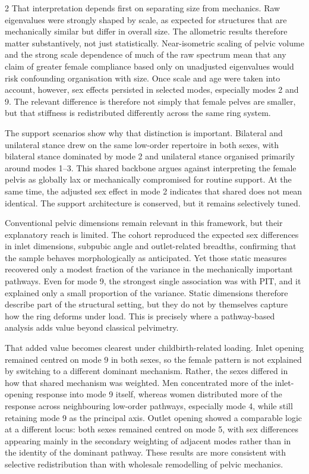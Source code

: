 \documentclass[openacc]{rsproca_new}
\begin{document}
\begin{multicols}{2}
That interpretation depends first on separating size from mechanics. Raw eigenvalues were strongly shaped by scale, as expected for structures that are mechanically similar but differ in overall size. The allometric results therefore matter substantively, not just statistically. Near-isometric scaling of pelvic volume and the strong scale dependence of much of the raw spectrum mean that any claim of greater female compliance based only on unadjusted eigenvalues would risk confounding organisation with size. Once scale and age were taken into account, however, sex effects persisted in selected modes, especially modes 2 and 9. The relevant difference is therefore not simply that female pelves are smaller, but that stiffness is redistributed differently across the same ring system.

The support scenarios show why that distinction is important. Bilateral and unilateral stance drew on the same low-order repertoire in both sexes, with bilateral stance dominated by mode 2 and unilateral stance organised primarily around modes 1--3. This shared backbone argues against interpreting the female pelvis as globally lax or mechanically compromised for routine support. At the same time, the adjusted sex effect in mode 2 indicates that shared does not mean identical. The support architecture is conserved, but it remains selectively tuned.

Conventional pelvic dimensions remain relevant in this framework, but their explanatory reach is limited. The cohort reproduced the expected sex differences in inlet dimensions, subpubic angle and outlet-related breadths, confirming that the sample behaves morphologically as anticipated. Yet those static measures recovered only a modest fraction of the variance in the mechanically important pathways. Even for mode 9, the strongest single association was with PIT, and it explained only a small proportion of the variance. Static dimensions therefore describe part of the structural setting, but they do not by themselves capture how the ring deforms under load. This is precisely where a pathway-based analysis adds value beyond classical pelvimetry.

That added value becomes clearest under childbirth-related loading. Inlet opening remained centred on mode 9 in both sexes, so the female pattern is not explained by switching to a different dominant mechanism. Rather, the sexes differed in how that shared mechanism was weighted. Men concentrated more of the inlet-opening response into mode 9 itself, whereas women distributed more of the response across neighbouring low-order pathways, especially mode 4, while still retaining mode 9 as the principal axis. Outlet opening showed a comparable logic at a different locus: both sexes remained centred on mode 5, with sex differences appearing mainly in the secondary weighting of adjacent modes rather than in the identity of the dominant pathway. These results are more consistent with selective redistribution than with wholesale remodelling of pelvic mechanics.


\end{multicols}
\end{document}
